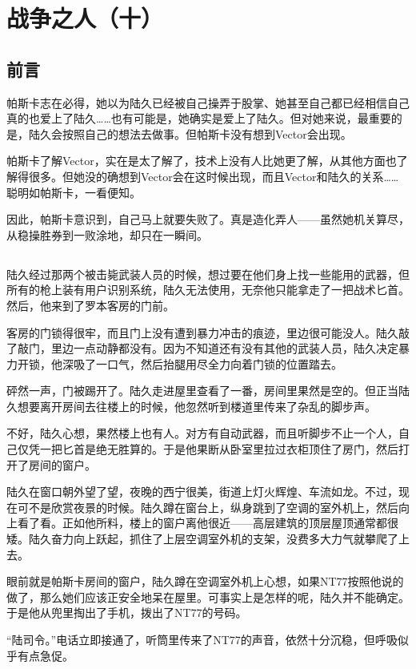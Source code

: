 \chapter{战争之人（十）}
\section*{前言}
帕斯卡志在必得，她以为陆久已经被自己操弄于股掌、她甚至自己都已经相信自己真的也爱上了陆久……也有可能是，她确实是爱上了陆久。但对她来说，最重要的是，陆久会按照自己的想法去做事。但帕斯卡没有想到Vector会出现。

帕斯卡了解Vector，实在是太了解了，技术上没有人比她更了解，从其他方面也了解得很多。但她没的确想到Vector会在这时候出现，而且Vector和陆久的关系……聪明如帕斯卡，一看便知。

因此，帕斯卡意识到，自己马上就要失败了。真是造化弄人——虽然她机关算尽，从稳操胜券到一败涂地，却只在一瞬间。

\lineseparator
\section*{}

陆久经过那两个被击毙武装人员的时候，想过要在他们身上找一些能用的武器，但所有的枪上装有用户识别系统，陆久无法使用，无奈他只能拿走了一把战术匕首。然后，他来到了罗本客房的门前。

客房的门锁得很牢，而且门上没有遭到暴力冲击的痕迹，里边很可能没人。陆久敲了敲门，里边一点动静都没有。因为不知道还有没有其他的武装人员，陆久决定暴力开锁，他深吸了一口气，然后抬腿用尽全力向着门锁的位置踏去。

砰然一声，门被踢开了。陆久走进屋里查看了一番，房间里果然是空的。但正当陆久想要离开房间去往楼上的时候，他忽然听到楼道里传来了杂乱的脚步声。

不好，陆久心想，果然楼上也有人。对方有自动武器，而且听脚步不止一个人，自己仅凭一把匕首是绝无胜算的。于是他果断从卧室里拉过衣柜顶住了房门，然后打开了房间的窗户。

陆久在窗口朝外望了望，夜晚的西宁很美，街道上灯火辉煌、车流如龙。不过，现在可不是欣赏夜景的时候。陆久蹲在窗台上，纵身跳到了空调的室外机上，然后向上看了看。正如他所料，楼上的窗户离他很近——高层建筑的顶层屋顶通常都很矮。陆久奋力向上跃起，抓住了上层空调室外机的支架，没费多大力气就攀爬了上去。

眼前就是帕斯卡房间的窗户，陆久蹲在空调室外机上心想，如果NT77按照他说的做了，那么她们应该正安全地呆在屋里。可事实上是怎样的呢，陆久并不能确定。于是他从兜里掏出了手机，拨出了NT77的号码。

“陆司令。”电话立即接通了，听筒里传来了NT77的声音，依然十分沉稳，但呼吸似乎有点急促。

